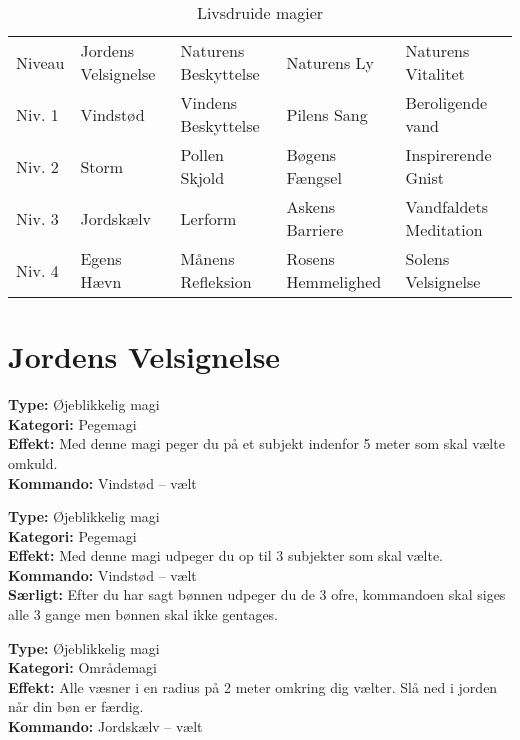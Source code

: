 \begin{table}[H]
    \centering
    \begin{tabular}{|p{}|p{}|p{}|p{}|p{}|}
    \hline
    \rowcolor{cerulean!80}
    \multicolumn{5}{c}{Livsdruide magi}\\
    \hline
    \rowcolor{cerulean!40}
         Niveau & Jordens Velsignelse & Naturens Beskyttelse & Naturens Ly & Naturens Vitalitet \\\hline
        Niv. 1 & Vindstød & Vindens Beskyttelse & Pilens Sang & Beroligende vand\\\hline
        Niv. 2 & Storm & Pollen Skjold & Bøgens Fængsel & Inspirerende Gnist\\\hline
         Niv. 3 & Jordskælv & Lerform & Askens Barriere & Vandfaldets Meditation\\\hline
         Niv. 4 & Egens Hævn & Månens Refleksion & Rosens Hemmelighed & Solens Velsignelse\\\hline
         \end{tabular}
         \caption{Livsdruide magier}
\end{table}
\newpage
\section*{Jordens Velsignelse}
\begin{jord*}[Vindstød]
\textbf{Type:} Øjeblikkelig magi\\
\textbf{Kategori:} Pegemagi\\
\textbf{Effekt:} Med denne magi peger du på et subjekt indenfor 5 meter som skal vælte omkuld.\\
\textbf{Kommando:} Vindstød – vælt
\end{jord*}

\begin{jord*}[Storm]
\textbf{Type:} Øjeblikkelig magi\\ 
\textbf{Kategori:} Pegemagi\\
\textbf{Effekt:} Med denne magi udpeger du op til 3 subjekter som skal vælte.\\
\textbf{Kommando:} Vindstød – vælt\\
\textbf{Særligt:} Efter du har sagt bønnen udpeger du de 3 ofre, kommandoen skal siges alle 3 gange men bønnen skal ikke gentages.
\end{jord*}

\begin{jord*}[Jordskælv]
\textbf{Type:} Øjeblikkelig magi\\
\textbf{Kategori:} Områdemagi\\
\textbf{Effekt:} Alle væsner i en radius på 2 meter omkring dig vælter. Slå ned i jorden når din bøn er færdig.\\
\textbf{Kommando:} Jordskælv – vælt
\end{jord*}

